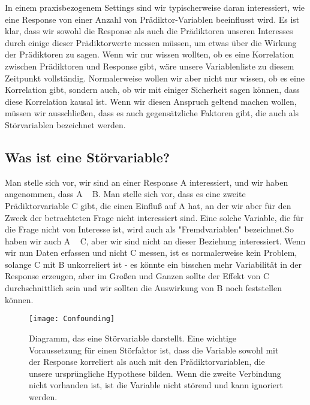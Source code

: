 \documentclass[a4paper,twoside]{tufte-book}\usepackage[]{graphicx}\usepackage[]{color}
\begin{document}
In einem praxisbezogenem Settings sind wir typischerweise daran interessiert, wie eine Response von einer Anzahl von Prädiktor-Variablen beeinflusst wird. Es ist klar, dass wir sowohl die Response als auch die Prädiktoren unseren Interesses durch einige dieser Prädiktorwerte messen müssen, um etwas über die Wirkung der Prädiktoren zu sagen. Wenn wir nur wissen wollten, ob es eine Korrelation zwischen Prädiktoren und Response gibt, wäre unsere Variablenliste zu diesem Zeitpunkt vollständig. Normalerweise wollen wir aber nicht nur wissen, ob es eine Korrelation gibt, sondern auch, ob wir mit einiger Sicherheit sagen können, dass diese Korrelation kausal ist. Wenn wir diesen Anspruch geltend machen wollen, müssen wir ausschließen, dass es auch gegensätzliche Faktoren gibt, die auch als Störvariablen bezeichnet werden.

\subsection{Was ist eine Störvariable?}

Man stelle sich vor, wir sind an einer Response A interessiert, und wir haben angenommen, dass A ~ B. Man stelle sich vor, dass es eine zweite Prädiktorvariable C gibt, die einen Einfluß auf A hat, an der wir aber für den Zweck der betrachteten Frage nicht interessiert sind. Eine solche Variable, die für die Frage nicht von Interesse ist, wird auch als "Fremdvariablen" bezeichnet.So haben wir auch A ~ C, aber wir sind nicht an dieser Beziehung interessiert. Wenn wir nun Daten erfassen und nicht C messen, ist es normalerweise kein Problem, solange C mit B unkorreliert ist - es könnte ein bisschen mehr Variabilität in der Response erzeugen, aber im Großen und Ganzen sollte der Effekt von C durchschnittlich sein und wir sollten die Auswirkung von B noch feststellen können.

\begin{figure}[]
\begin{center}
\texttt{[image: Confounding]}
\caption{Diagramm, das eine Störvariable darstellt. Eine wichtige Voraussetzung für einen Störfaktor ist, dass die Variable sowohl mit der Response korreliert als auch mit den Prädiktorvariablen, die unsere ursprüngliche Hypothese bilden. Wenn die zweite Verbindung nicht vorhanden ist, ist die Variable nicht störend und kann ignoriert werden.}
\label{fig: Confounding}
\end{center}
\end{figure}
\end{document}
